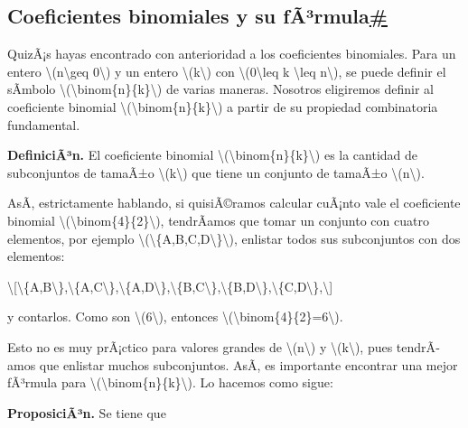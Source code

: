 \documentclass[
]{article}
\begin{document}
\label{coeficientes-binomiales-y-su-formula}
\subsection{\texorpdfstring{Coeficientes binomiales y su
fÃ³rmula\hyperref[coeficientes-binomiales-y-su-formula]{\#}}{Coeficientes binomiales y su fÃ³rmula\#}}\label{coeficientes-binomiales-y-su-fuxe3uxb3rmula}

QuizÃ¡s hayas encontrado con anterioridad a los coeficientes binomiales.
Para un entero {\textbackslash(n\textbackslash geq 0\textbackslash)} y
un entero {\textbackslash(k\textbackslash)} con
{\textbackslash(0\textbackslash leq k \textbackslash leq
n\textbackslash)}, se puede definir el sÃ­mbolo
{\textbackslash(\textbackslash binom\{n\}\{k\}\textbackslash)} de varias
maneras. Nosotros eligiremos definir al coeficiente binomial
{\textbackslash(\textbackslash binom\{n\}\{k\}\textbackslash)} a partir
de su propiedad combinatoria fundamental.

\textbf{DefiniciÃ³n.} El coeficiente binomial
{\textbackslash(\textbackslash binom\{n\}\{k\}\textbackslash)} es la
cantidad de subconjuntos de tamaÃ±o {\textbackslash(k\textbackslash)}
que tiene un conjunto de tamaÃ±o {\textbackslash(n\textbackslash)}.

AsÃ­, estrictamente hablando, si quisiÃ©ramos calcular cuÃ¡nto vale el
coeficiente binomial
{\textbackslash(\textbackslash binom\{4\}\{2\}\textbackslash)},
tendrÃ­amos que tomar un conjunto con cuatro elementos, por ejemplo
{\textbackslash(\textbackslash\{A,B,C,D\textbackslash\}\textbackslash)},
enlistar todos sus subconjuntos con dos elementos:

\textbackslash{[}\textbackslash\{A,B\textbackslash\},\textbackslash\{A,C\textbackslash\},\textbackslash\{A,D\textbackslash\},\textbackslash\{B,C\textbackslash\},\textbackslash\{B,D\textbackslash\},\textbackslash\{C,D\textbackslash\},\textbackslash{]}

y contarlos. Como son {\textbackslash(6\textbackslash)}, entonces
{\textbackslash(\textbackslash binom\{4\}\{2\}=6\textbackslash)}.

Esto no es muy prÃ¡ctico para valores grandes de
{\textbackslash(n\textbackslash)} y {\textbackslash(k\textbackslash)},
pues tendrÃ­amos que enlistar muchos subconjuntos. AsÃ­, es importante
encontrar una mejor fÃ³rmula para
{\textbackslash(\textbackslash binom\{n\}\{k\}\textbackslash)}. Lo
hacemos como sigue:

\textbf{ProposiciÃ³n.} Se tiene que
\end{document}
